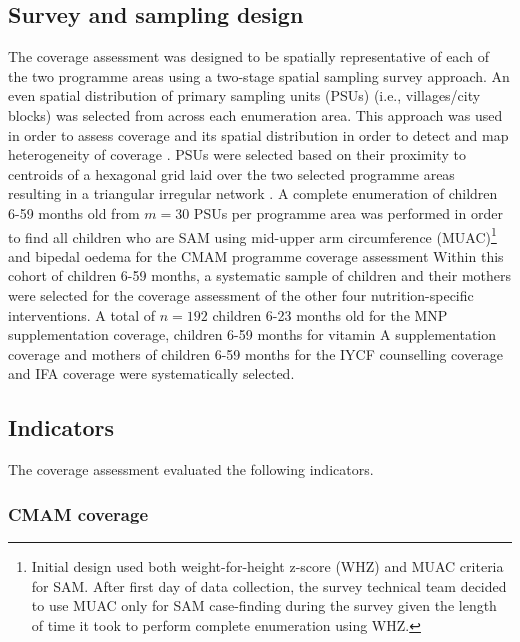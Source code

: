 \documentclass[12pt,a4paper]{article}
\let\rmarkdownfootnote\footnote%
\def\footnote{\protect\rmarkdownfootnote}
\begin{document}
\hypertarget{sample-design}{%
\subsection{Survey and sampling design}\label{sample-design}}

The coverage assessment was designed to be spatially representative of each of the two programme areas using a two-stage spatial sampling survey approach. An even spatial distribution of primary sampling units (PSUs) (i.e., villages/city blocks) was selected from across each enumeration area. This approach was used in order to assess coverage and its spatial distribution in order to detect and map heterogeneity of coverage \citep[\citet{Diggle:2014tk}]{Elliott:2004cg}. PSUs were selected based on their proximity to centroids of a hexagonal grid laid over the two selected programme areas resulting in a triangular irregular network \citep{Isaaks:1989uk, Elliot:2000vs}. A complete enumeration of children 6-59 months old from \(m = 30\) PSUs per programme area was performed in order to find all children who are SAM using mid-upper arm circumference (MUAC)\footnote{Initial design used both weight-for-height z-score (WHZ) and MUAC criteria for SAM. After first day of data collection, the survey technical team decided to use MUAC only for SAM case-finding during the survey given the length of time it took to perform complete enumeration using WHZ.} and bipedal oedema for the CMAM programme coverage assessment Within this cohort of children 6-59 months, a systematic sample of children and their mothers were selected for the coverage assessment of the other four nutrition-specific interventions. A total of \(n = 192\) children 6-23 months old for the MNP supplementation coverage, children 6-59 months for vitamin A supplementation coverage and mothers of children 6-59 months for the IYCF counselling coverage and IFA coverage were systematically selected.

\hypertarget{indicators}{%
\subsection{Indicators}\label{indicators}}

The coverage assessment evaluated the following indicators.

\hypertarget{cmam-coverage}{%
\subsubsection{CMAM coverage}\label{cmam-coverage}}
\end{document}
